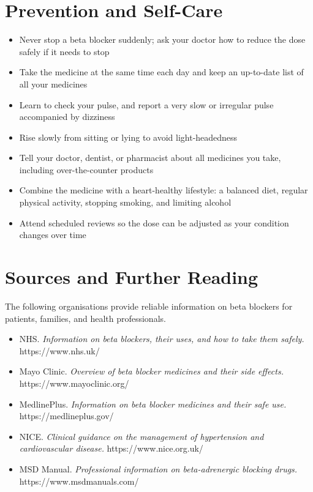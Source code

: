 \section*{Prevention and Self-Care}
\begin{itemize}
    \item Never stop a beta blocker suddenly; ask your doctor how to reduce the dose safely if it needs to stop
    \item Take the medicine at the same time each day and keep an up-to-date list of all your medicines
    \item Learn to check your pulse, and report a very slow or irregular pulse accompanied by dizziness
    \item Rise slowly from sitting or lying to avoid light-headedness
    \item Tell your doctor, dentist, or pharmacist about all medicines you take, including over-the-counter products
    \item Combine the medicine with a heart-healthy lifestyle: a balanced diet, regular physical activity, stopping smoking, and limiting alcohol
    \item Attend scheduled reviews so the dose can be adjusted as your condition changes over time
\end{itemize}

\section*{Sources and Further Reading}
The following organisations provide reliable information on beta blockers for patients, families, and health professionals.

\begin{itemize}
    \item NHS. \textit{Information on beta blockers, their uses, and how to take them safely.} https://www.nhs.uk/
    \item Mayo Clinic. \textit{Overview of beta blocker medicines and their side effects.} https://www.mayoclinic.org/
    \item MedlinePlus. \textit{Information on beta blocker medicines and their safe use.} https://medlineplus.gov/
    \item NICE. \textit{Clinical guidance on the management of hypertension and cardiovascular disease.} https://www.nice.org.uk/
    \item MSD Manual. \textit{Professional information on beta-adrenergic blocking drugs.} https://www.msdmanuals.com/
\end{itemize}
